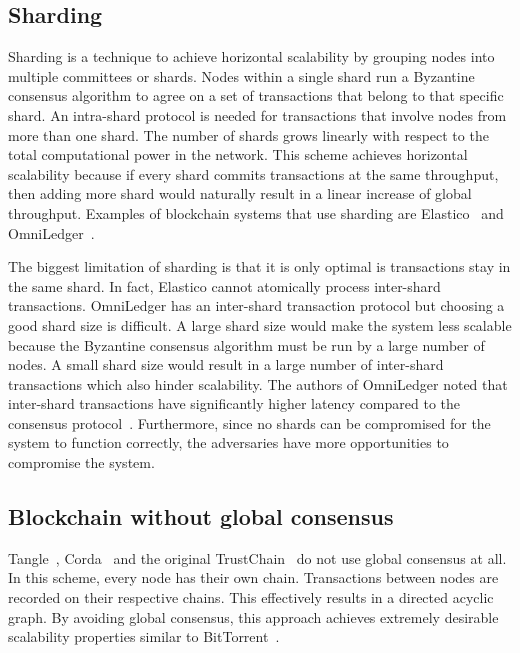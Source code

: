 \subsection{Sharding}

Sharding is a technique to achieve horizontal scalability by grouping nodes into multiple committees or shards.
Nodes within a single shard run a Byzantine consensus algorithm to agree on a set of transactions that belong to that specific shard.
An intra-shard protocol is needed for transactions that involve nodes from more than one shard.
The number of shards grows linearly with respect to the total computational power in the network.
This scheme achieves horizontal scalability because if every shard commits transactions at the same throughput,
then adding more shard would naturally result in a linear increase of global throughput.
Examples of blockchain systems that use sharding are Elastico~\cite{luu2016elastico} and OmniLedger~\cite{kokoris2017omniledger}.

The biggest limitation of sharding is that it is only optimal is transactions stay in the same shard.
In fact, Elastico cannot atomically process inter-shard transactions.
OmniLedger has an inter-shard transaction protocol but choosing a good shard size is difficult.
A large shard size would make the system less scalable because the Byzantine consensus algorithm must be run by a large number of nodes.
A small shard size would result in a large number of inter-shard transactions which also hinder scalability.
The authors of OmniLedger noted that inter-shard transactions have significantly higher latency compared to the consensus protocol~\cite{kokoris2017omniledger}.
Furthermore, since no shards can be compromised for the system to function correctly,
the adversaries have more opportunities to compromise the system.

\subsection{Blockchain without global consensus}

Tangle~\cite{tangle}, Corda~\cite{corda} and the original TrustChain~\cite{multichain} do not use global consensus at all.
In this scheme, every node has their own chain.
Transactions between nodes are recorded on their respective chains.
This effectively results in a directed acyclic graph.
By avoiding global consensus, this approach achieves extremely desirable scalability properties similar to BitTorrent~\cite{cohen2003incentives}.

